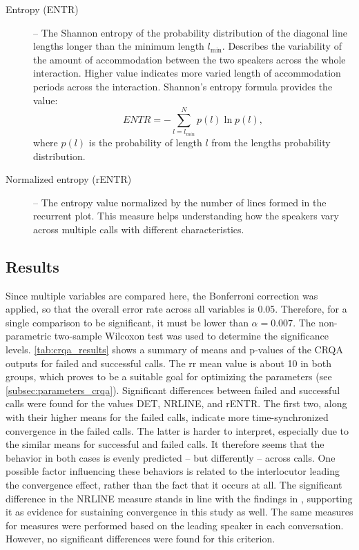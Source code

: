 \begin{description}
	\item[Entropy (ENTR)] -- The Shannon entropy of the probability distribution of the diagonal line lengths longer than the minimum length $l_{\min}$.
	Describes the variability of the amount of accommodation between the two speakers across the whole interaction.
	Higher value indicates more varied length of accommodation periods across the interaction.
	Shannon's entropy formula provides the value:
	\begin{equation}
		\label{eq:entr}
		ENTR = -\sum_{l=l_{min}}^{N} p(l) \ln p(l),
	\end{equation}
	where $p(l)$ is the probability of length $l$ from the lengths probability distribution.
	\item[Normalized entropy (rENTR)] -- The entropy value normalized by the number of lines formed in the recurrent plot.
	This measure helps understanding how the speakers vary across multiple calls with different characteristics.
\end{description}
%

\subsection{Results}
\label{subsec:results_hhi}

Since multiple variables are compared here, the Bonferroni correction \citep{Bonferroni1936teoria} was applied, so that the overall error rate across all variables is \num{0.05}.
Therefore, for a single comparison to be significant, it must be lower than $\alpha = 0.007$.
The non-parametric two-sample Wilcoxon test \citep{Wilcoxon1945individual} was used to determine the significance levels.
\cref{tab:crqa_results} shows a summary of means and p-values of the CRQA outputs for failed and successful calls.
The \ac{rr} mean value is about 10 in both groups, which proves to be a suitable goal for optimizing the parameters (see \cref{subsec:parameters_crqa}).
Significant differences between failed and successful calls were found for the values DET, NRLINE, and rENTR.
The first two, along with their higher means for the failed calls, indicate more time-synchronized convergence in the failed calls.
The latter is harder to interpret, especially due to the similar means for successful and failed calls.
It therefore seems that the behavior in both cases is evenly predicted -- but differently -- across calls.
One possible factor influencing these behaviors is related to the interlocutor leading the convergence effect, rather than the fact that it occurs at all.
The significant difference in the NRLINE measure stands in line with the findings in \citet{Borrie2019syncing}, supporting it as evidence for sustaining convergence in this study as well.
The same measures for measures were performed based on the leading speaker in each conversation.
However, no significant differences were found for this criterion.

